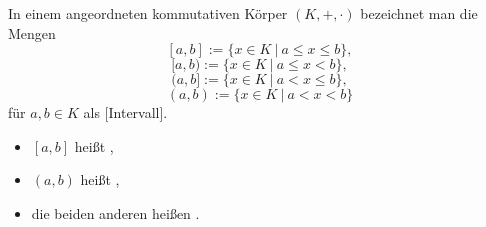 In einem angeordneten kommutativen Körper $(K, +, \cdot)$ bezeichnet man die Mengen
$$[a, b] := \{x \in K \ | \ a \leq x \leq b \},$$
$$[a, b) := \{x \in K \ | \ a \leq x < b \},$$
$$(a, b] := \{x \in K \ | \ a < x \leq b \},$$
$$(a, b) := \{x \in K \ | \ a < x < b \}$$
für $a, b \in K$ als [Intervall].
\begin{itemize}
    \item $[a, b]$ heißt ,
    \item $(a, b)$ heißt ,
    \item die beiden anderen heißen .
\end{itemize}